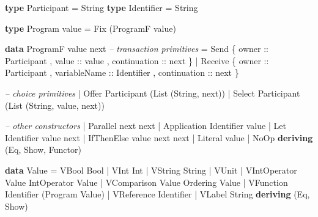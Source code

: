 \documentclass[runningheads]{llncs}
\newenvironment{Shaded}{}{}
\newcommand{\KeywordTok}[1]{\textcolor[rgb]{0.00,0.44,0.13}{\textbf{#1}}}
\newcommand{\DataTypeTok}[1]{\textcolor[rgb]{0.56,0.13,0.00}{#1}}
\newcommand{\CommentTok}[1]{\textcolor[rgb]{0.38,0.63,0.69}{\textit{#1}}}
\newcommand{\OtherTok}[1]{\textcolor[rgb]{0.00,0.44,0.13}{#1}}
\newcommand{\FunctionTok}[1]{\textcolor[rgb]{0.02,0.16,0.49}{#1}}
\newcommand{\NormalTok}[1]{#1}
\begin{document}
\begin{Shaded}
\begin{Highlighting}[]
\KeywordTok{type} \DataTypeTok{Participant} \FunctionTok{=} \DataTypeTok{String}
\KeywordTok{type} \DataTypeTok{Identifier} \FunctionTok{=} \DataTypeTok{String}

\KeywordTok{type} \DataTypeTok{Program}\NormalTok{ value }\FunctionTok{=} \DataTypeTok{Fix}\NormalTok{ (}\DataTypeTok{ProgramF}\NormalTok{ value) }

\KeywordTok{data} \DataTypeTok{ProgramF}\NormalTok{ value next }
    \CommentTok{-- transaction primitives}
    \FunctionTok{=} \DataTypeTok{Send} 
\NormalTok{        \{}\OtherTok{ owner ::} \DataTypeTok{Participant}
\NormalTok{        ,}\OtherTok{ value ::}\NormalTok{ value}
\NormalTok{        ,}\OtherTok{ continuation ::}\NormalTok{ next }
\NormalTok{        \}}
    \FunctionTok{|} \DataTypeTok{Receive} 
\NormalTok{        \{}\OtherTok{ owner ::} \DataTypeTok{Participant}
\NormalTok{        ,}\OtherTok{ variableName ::} \DataTypeTok{Identifier}
\NormalTok{        ,}\OtherTok{ continuation ::}\NormalTok{ next  }
\NormalTok{        \}}

    \CommentTok{-- choice primitives}
    \FunctionTok{|} \DataTypeTok{Offer} \DataTypeTok{Participant}\NormalTok{ (}\DataTypeTok{List}\NormalTok{ (}\DataTypeTok{String}\NormalTok{, next))}
    \FunctionTok{|} \DataTypeTok{Select} \DataTypeTok{Participant}\NormalTok{ (}\DataTypeTok{List}\NormalTok{ (}\DataTypeTok{String}\NormalTok{, value, next))}

    \CommentTok{-- other constructors }
    \FunctionTok{|} \DataTypeTok{Parallel}\NormalTok{ next next }
    \FunctionTok{|} \DataTypeTok{Application} \DataTypeTok{Identifier}\NormalTok{ value}
    \FunctionTok{|} \DataTypeTok{Let} \DataTypeTok{Identifier}\NormalTok{ value next }
    \FunctionTok{|} \DataTypeTok{IfThenElse}\NormalTok{ value next next}
    \FunctionTok{|} \DataTypeTok{Literal}\NormalTok{ value }
    \FunctionTok{|} \DataTypeTok{NoOp}
    \KeywordTok{deriving}\NormalTok{ (}\DataTypeTok{Eq}\NormalTok{, }\DataTypeTok{Show}\NormalTok{, }\DataTypeTok{Functor}\NormalTok{)}


\KeywordTok{data} \DataTypeTok{Value} 
    \FunctionTok{=} \DataTypeTok{VBool} \DataTypeTok{Bool}
    \FunctionTok{|} \DataTypeTok{VInt} \DataTypeTok{Int}
    \FunctionTok{|} \DataTypeTok{VString} \DataTypeTok{String}
    \FunctionTok{|} \DataTypeTok{VUnit}
    \FunctionTok{|} \DataTypeTok{VIntOperator} \DataTypeTok{Value} \DataTypeTok{IntOperator} \DataTypeTok{Value} 
    \FunctionTok{|} \DataTypeTok{VComparison} \DataTypeTok{Value} \DataTypeTok{Ordering} \DataTypeTok{Value}
    \FunctionTok{|} \DataTypeTok{VFunction} \DataTypeTok{Identifier}\NormalTok{ (}\DataTypeTok{Program} \DataTypeTok{Value}\NormalTok{)}
    \FunctionTok{|} \DataTypeTok{VReference} \DataTypeTok{Identifier} 
    \FunctionTok{|} \DataTypeTok{VLabel} \DataTypeTok{String}
    \KeywordTok{deriving}\NormalTok{ (}\DataTypeTok{Eq}\NormalTok{, }\DataTypeTok{Show}\NormalTok{)}
\end{Highlighting}
\end{Shaded}
\end{document}
